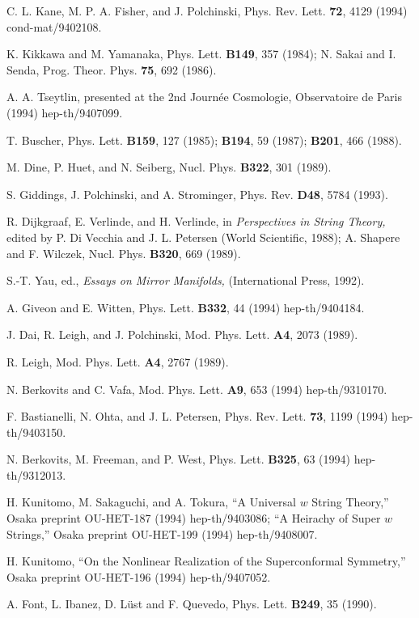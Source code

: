 \begin{thebibliography}{99}
 C. L. Kane, M. P. A. Fisher, and J. Polchinski,
Phys. Rev. Lett. {\bf 72}, 4129 (1994) cond-mat/9402108.

 K. Kikkawa and M. Yamanaka, Phys. Lett. {\bf B149},
357 (1984);
N. Sakai and I. Senda, Prog. Theor. Phys. {\bf 75},
692 (1986).

 A. A. Tseytlin, presented at the 2nd Journ\'ee
Cosmologie, Observatoire de Paris (1994) hep-th/9407099.

 T. Buscher, Phys. Lett. {\bf B159}, 127 (1985);
{\bf B194}, 59 (1987); {\bf B201}, 466 (1988).

 M. Dine, P. Huet, and N. Seiberg, Nucl. Phys. {\bf
B322}, 301 (1989).

 S. Giddings, J. Polchinski, and A. Strominger,
Phys. Rev. {\bf D48}, 5784 (1993).

 R. Dijkgraaf, E. Verlinde, and H. Verlinde,
in {\it Perspectives in String Theory,} edited by P. Di Vecchia and
J. L. Petersen (World Scientific, 1988);
A. Shapere and F. Wilczek, Nucl. Phys. {\bf B320},
669 (1989).
 
 S.-T. Yau, ed., {\it Essays on Mirror Manifolds,}
(International Press, 1992).

 A. Giveon and E. Witten,
Phys. Lett. {\bf B332}, 44 (1994) hep-th/9404184.

 J. Dai, R. Leigh, and J. Polchinski,
Mod. Phys. Lett. {\bf A4}, 2073 (1989).

 R. Leigh, Mod. Phys. Lett. {\bf A4}, 2767
(1989).

 N. Berkovits and C. Vafa,
Mod. Phys. Lett. {\bf A9}, 653 (1994) hep-th/9310170.

 F. Bastianelli, N. Ohta, and J. L. Petersen,
Phys. Rev. Lett. {\bf 73}, 1199 (1994) hep-th/9403150.

 N. Berkovits, M. Freeman, and P. West,
Phys. Lett. {\bf B325}, 63 (1994) hep-th/9312013.

 H. Kunitomo, M. Sakaguchi, and A. Tokura,
``A Universal $w$ String Theory,'' Osaka preprint OU-HET-187
(1994) hep-th/9403086;  ``A Heirachy of Super $w$ Strings,'' 
Osaka preprint OU-HET-199 (1994) hep-th/9408007.

 H. Kunitomo, ``On the Nonlinear Realization of the
Superconformal Symmetry,'' Osaka preprint OU-HET-196
(1994) hep-th/9407052.

 A. Font, L. Ibanez, D. L\"ust and F. Quevedo,
Phys. Lett. {\bf B249}, 35 (1990).


\end{thebibliography}
